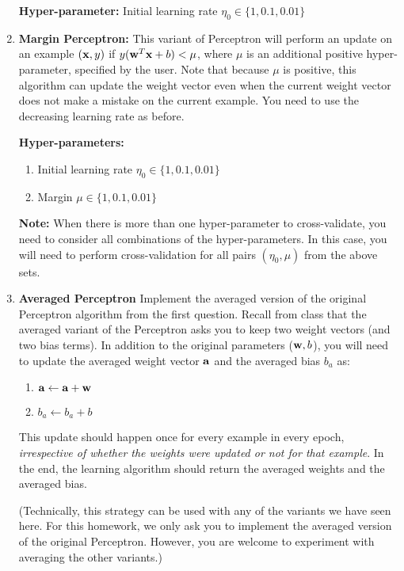\begin{enumerate}
  \textbf{Hyper-parameter:} Initial learning rate
  $\eta_0\in \{1,0.1,0.01\}$

\item \textbf{Margin Perceptron:} This variant of Perceptron will
  perform an update on an example $({\bf x}, y)$ if
  $y({\bf w}^T{\bf x} + b) < \mu$, where $\mu$ is an additional positive
  hyper-parameter, specified by the user. Note that because $\mu$ is
  positive, this algorithm can update the weight vector even when
  the current weight vector does not make a mistake on the current
  example.  You need to use the decreasing learning rate as before.

  \textbf{Hyper-parameters:} 
  \begin{enumerate}
  \item Initial learning rate $\eta_0\in \{1,0.1,0.01\}$ 
  \item Margin $\mu\in\{1,0.1,0.01\}$
  \end{enumerate}

  \textbf{Note:} When there is more than one hyper-parameter to
  cross-validate, you need to consider all combinations of the
  hyper-parameters. In this case, you will need to perform
  cross-validation for all pairs $(\eta_0, \mu)$ from the above
  sets.


\item\textbf{Averaged Perceptron} Implement the averaged version of
  the original Perceptron algorithm from the first question. Recall
  from class that the averaged variant of the Perceptron asks you to
  keep two weight vectors (and two bias terms). In addition to the
  original parameters (${\bf w}, b$), you will need to update the averaged
  weight vector ${\bf a}$ and the averaged bias $b_a$ as:

  \begin{enumerate}
  \item ${\bf a} \leftarrow {\bf a} + {\bf w}$
  \item $b_a \leftarrow b_a + b$
  \end{enumerate}
  
  This update should happen once for every example in every epoch,
  {\em irrespective of whether the weights were updated or not for
    that example}. In the end, the learning algorithm should return
  the averaged weights and the averaged bias.

  (Technically, this strategy can be used with any of the variants we
  have seen here. For this homework, we only ask you to implement the
  averaged version of the original Perceptron. However, you are
  welcome to experiment with averaging the other variants.)


\end{enumerate}
